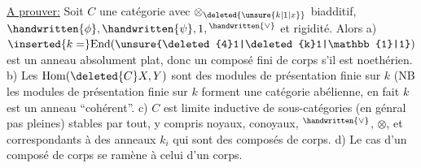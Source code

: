 \uline{A prouver:} Soit $C$ une catégorie  avec $\otimes_{\deleted{\unsure{k|1|x}}}$ biadditif, $\handwritten{\phi},\handwritten{\psi},1,{}^{\handwritten{\vee}}$ et rigidité. Alors a) $\inserted{k=}\mathrm{End}(\unsure{\deleted{4}1|\deleted{k}1|\mathbb{1}|1})$ est un anneau absolument plat, donc un composé fini de  corps s'il est noethérien. b) Les $\mathrm{Hom}(\deleted{C}X,Y)$ sont des modules de présentation finie  \deleted{(}sur $k$ (NB les modules de présentation finie sur $k$ forment une catégorie abélienne, en fait $k$ est un anneau ``cohérent''\unsure{\deleted{,})|)}. c)  $C$ est limite inductive de sous-catégories (en génral pas pleines) stables par tout, y compris noyaux, conoyaux, ${}^{\handwritten{\vee}}$, $\otimes$, et correspondants à des anneaux $k_{i}$ qui sont des  composés de corps. d) Le cas d'un composé de corps se ramène à celui d'un corps.
